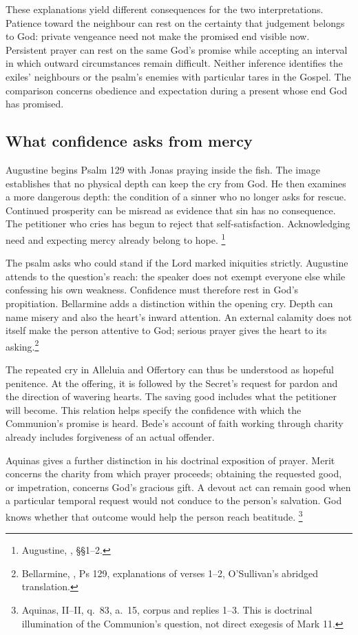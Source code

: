 These explanations yield different consequences for the two
interpretations. Patience toward the neighbour can rest on the
certainty that judgement belongs to God: private vengeance need
not make the promised end visible now. Persistent prayer can rest
on the same God's promise while accepting an interval in which
outward circumstances remain difficult. Neither inference identifies
the exiles' neighbours or the psalm's enemies with particular tares
in the Gospel. The comparison concerns obedience and expectation
during a present whose end God has promised.

\subsection{What confidence asks from mercy}
Augustine begins Psalm 129 with Jonas praying inside the fish.
The image establishes that no physical depth can keep the cry
from God. He then examines a more dangerous depth: the condition
of a sinner who no longer asks for rescue. Continued prosperity
can be misread as evidence that sin has no consequence. The
petitioner who cries has begun to reject that self-satisfaction.
Acknowledging need and expecting mercy already belong to hope.
\footnote{Augustine, , §§1--2.}

The psalm asks who could stand if the Lord marked iniquities
strictly. Augustine attends to the question's reach: the speaker
does not exempt everyone else while confessing his own weakness.
Confidence must therefore rest in God's propitiation. Bellarmine
adds a distinction within the opening cry. Depth can name misery
and also the heart's inward attention. An external calamity does
not itself make the person attentive to God; serious prayer gives
the heart to its asking.\footnote{Bellarmine, , Ps 129, explanations of verses 1--2,
O'Sullivan's abridged translation.}

The repeated cry in Alleluia and Offertory can thus be understood
as hopeful penitence. At the offering, it is followed by the
Secret's request for pardon and the direction of wavering hearts.
The saving good includes what the petitioner will become. This
relation helps specify the confidence with which the Communion's
promise is heard. Bede's account of faith working through charity
already includes forgiveness of an actual offender.

Aquinas gives a further distinction in his doctrinal exposition
of prayer. Merit concerns the charity from which prayer proceeds;
obtaining the requested good, or impetration, concerns God's gracious
gift. A devout act can remain good when a particular temporal
request would not conduce to the person's salvation. God knows
whether that outcome would help the person reach beatitude.
\footnote{Aquinas,  II--II, q.~83, a.~15,
corpus and replies 1--3. This is doctrinal illumination of the
Communion's question, not direct exegesis of Mark 11.}

